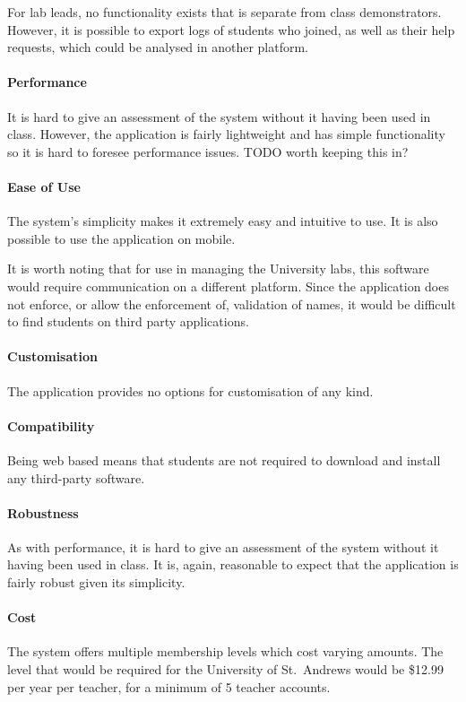 For lab leads, no functionality exists that is separate from class demonstrators. However, it is possible to export logs of students who joined, as well as their help requests, which could be analysed in another platform.


\paragraph{Performance}  
It is hard to give an assessment of the system without it having been used in class. However, the application is fairly lightweight and has simple functionality so it is hard to foresee performance issues. TODO worth keeping this in?

\paragraph{Ease of Use}
The system's simplicity makes it extremely easy and intuitive to use. It is also possible to use the application on mobile. 

It is worth noting that for use in managing the University labs, this software would require communication on a different platform. Since the application does not enforce, or allow the enforcement of, validation of names, it would be difficult to find students on third party applications.


\paragraph{Customisation} 
The application provides no options for customisation of any kind.


\paragraph{Compatibility}  
Being web based means that students are not required to download and install any third-party software. 


\paragraph{Robustness}
As with performance, it is hard to give an assessment of the system without it having been used in class. It is, again, reasonable to expect that the application is fairly robust given its simplicity.


\paragraph{Cost}  
The system offers multiple membership levels which cost varying amounts. The level that would be required for the University of St.\ Andrews would be \$12.99 per year per teacher, for a minimum of 5 teacher accounts.

